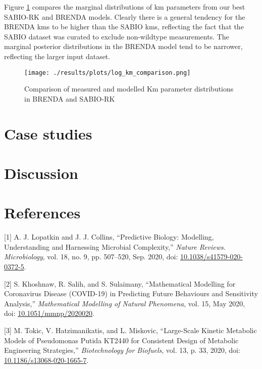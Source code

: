 \documentclass[11pt]{article}
\begin{document}
Figure \ref{fig:orgdc7a843} compares the marginal distributions of km
parameters from our best SABIO-RK and BRENDA models. Clearly there is a general
tendency for the BRENDA kms to be higher than the SABIO kms, reflecting the fact
that the SABIO dataset was curated to exclude non-wildtype measurements. The
marginal posterior distributions in the BRENDA model tend to be narrower,
reflecting the larger input dataset.

\begin{figure}[htbp]
\centering
\texttt{[image: ./results/plots/log\_km\_comparison.png]}
\caption{\label{fig:orgdc7a843}Comparison of measured and modelled Km parameter distributions in BRENDA and SABIO-RK}
\end{figure}

\section{Case studies}
\label{sec:org09980f5}
\section{Discussion}
\label{sec:orgc78dc85}
\section{References}
\label{sec:org53c82c6}

\hypertarget{citeproc_bib_item_1}{[1] A. J. Lopatkin and J. J. Collins, “Predictive Biology: Modelling, Understanding and Harnessing Microbial Complexity,” \textit{Nature Reviews. Microbiology}, vol. 18, no. 9, pp. 507–520, Sep. 2020, doi: \href{https://doi.org/10.1038/s41579-020-0372-5}{10.1038/s41579-020-0372-5}.}

\hypertarget{citeproc_bib_item_2}{[2] S. Khoshnaw, R. Salih, and S. Sulaimany, “Mathematical Modelling for Coronavirus Disease (COVID-19) in Predicting Future Behaviours and Sensitivity Analysis,” \textit{Mathematical Modelling of Natural Phenomena}, vol. 15, May 2020, doi: \href{https://doi.org/10.1051/mmnp/2020020}{10.1051/mmnp/2020020}.}

\hypertarget{citeproc_bib_item_3}{[3] M. Tokic, V. Hatzimanikatis, and L. Miskovic, “Large-Scale Kinetic Metabolic Models of Pseudomonas Putida KT2440 for Consistent Design of Metabolic Engineering Strategies,” \textit{Biotechnology for Biofuels}, vol. 13, p. 33, 2020, doi: \href{https://doi.org/10.1186/s13068-020-1665-7}{10.1186/s13068-020-1665-7}.}
\end{document}
